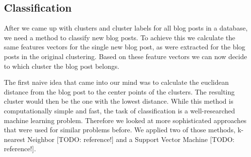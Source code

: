 \subsection{Classification}
\label{sec:classification}

After we came up with clusters and cluster labels for all blog posts in a database, we need a method to classify new blog posts. %
To achieve this we calculate the same features vectors for the single new blog post, as were extracted for the blog posts in the original clustering.
Based on these feature vectors we can now decide to which cluster the blog post belongs.


The first naive idea that came into our mind was to calculate the euclidean distance from the blog post to the center points of the clusters.
The resulting cluster would then be the one with the lowest distance.
While this method is computationally simple and fast, the task of classification is a well-researched machine learning problem.
Therefore we looked at more sophisticated approaches that were used for similar problems before.
We applied two of those methods, k-nearest Neighbor [TODO: reference!] and a Support Vector Machine [TODO: reference!].

